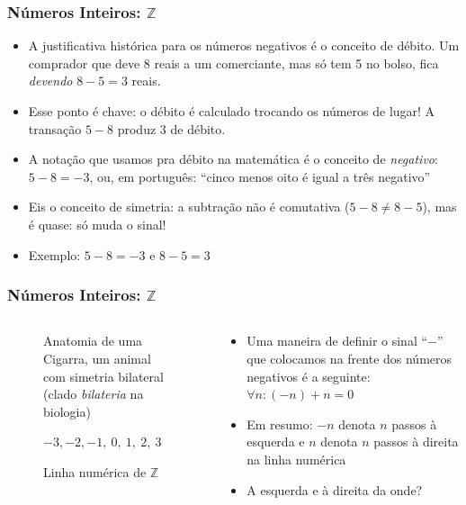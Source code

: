 \documentclass[usenames,dvipsnames,svgnames]{beamer}
\begin{document}
\begin{frame}	
	\frametitle{Números Inteiros: $\mathbb{Z}$}

	\begin{itemize}
		\item A justificativa histórica para os números negativos é o conceito de {\color{red}débito}. Um comprador que deve 8 reais a um comerciante, mas só tem 5 no bolso, fica \emph{devendo} $8 - 5 = 3$ reais.
		\item Esse ponto é chave: o débito é calculado trocando os números de lugar! A transação $5 - 8$ produz $3$ de débito.
		\item A notação que usamos pra débito na matemática é o conceito de \emph{negativo}: $5 - 8 = -3$, ou, em português: ``cinco menos oito é igual a três negativo''
		\item Eis o conceito de {\color{red}simetria}: a subtração não é comutativa ($5-8 \neq 8-5$), mas é {\color{red}quase}: só muda o sinal!
		\item Exemplo: $5-8=-3$ e $8-5=3$ 
 	\end{itemize}
\end{frame}

\begin{frame}	
	\frametitle{Números Inteiros: $\mathbb{Z}$}

	\begin{columns}[t]
	\begin{column}{.3\textwidth}
		\begin{figure}
			\caption{\small Anatomia de uma Cigarra, um animal com simetria bilateral (clado \emph{bilateria} na biologia)}
		\end{figure}
		\begin{figure}
			\small $-3, -2, -1, ~0, ~1, ~2, ~3$
			\caption{\small Linha numérica de $\mathbb{Z}$}
		\end{figure}
	\end{column}
	\begin{column}{.7\textwidth}
		\begin{itemize}
		\item Uma maneira de definir o sinal ``$-$'' que colocamos na frente dos números negativos é a seguinte: $\forall n: (-n) + n = 0$
		\item Em resumo: $-n$ denota $n$ passos à esquerda e $n$ denota $n$ passos à direita na linha numérica
		\item A esquerda e à direita da onde?
		\end{itemize}
	\end{column}
	\end{columns}
\end{frame}
\end{document}
